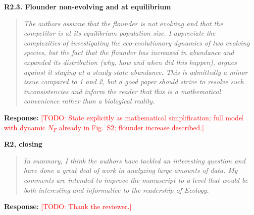 \documentclass[11pt]{article}
\newenvironment{revcomment}[1]
  {\par\medskip\noindent\textbf{#1}\par\begin{quote}\itshape\color{commentgrey}}
  {\end{quote}}
\newcommand{\response}{\par\noindent\textbf{Response:} }
\newcommand{\todo}[1]{\textcolor{red}{[TODO: #1]}}
\begin{document}
\begin{revcomment}{R2.3. Flounder non-evolving and at equilibrium}
The authors assume that the flounder is not evolving and that the competitor is at its equilibrium population size. I appreciate the complexities of investigating the eco-evolutionary dynamics of two evolving species, but the fact that the flounder has increased in abundance and expanded its distribution (why, how and when did this happen), argues against it staying at a steady-state abundance. This is admittedly a minor issue compared to 1 and 2, but a good paper should strive to resolve such inconsistencies and inform the reader that this is a mathematical convenience rather than a biological reality.
\end{revcomment}

\response \todo{State explicitly as mathematical simplification; full model with dynamic $N_F$ already in Fig.~S2; flounder increase described.}

\begin{revcomment}{R2, closing}
In summary, I think the authors have tackled an interesting question and have done a great deal of work in analyzing large amounts of data. My comments are intended to improve the manuscript to a level that would be both interesting and informative to the readership of Ecology.
\end{revcomment}

\response \todo{Thank the reviewer.}
\end{document}

